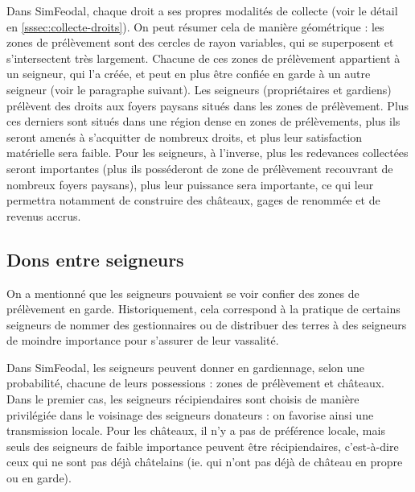 Dans SimFeodal, chaque droit a ses propres modalités de collecte (voir le détail en \cref{sssec:collecte-droits}).
On peut résumer cela de manière géométrique : les zones de prélèvement sont des cercles de rayon variables, qui se superposent et s'intersectent très largement.
Chacune de ces zones de prélèvement appartient à un seigneur, qui l'a créée, et peut en plus être confiée en garde à un autre seigneur (voir le paragraphe suivant).
Les seigneurs (propriétaires et gardiens) prélèvent des droits aux foyers paysans situés dans les zones de prélèvement.
Plus ces derniers sont situés dans une région dense en zones de prélèvements, plus ils seront amenés à s'acquitter de nombreux droits, et plus leur satisfaction matérielle sera faible.
Pour les seigneurs, à l'inverse, plus les redevances collectées seront importantes (plus ils posséderont de zone de prélèvement recouvrant de nombreux foyers paysans), plus leur puissance sera importante, ce qui leur permettra notamment de construire des châteaux, gages de renommée et de revenus accrus.

\subsection{Dons entre seigneurs \label{meca-dons}}

On a mentionné que les seigneurs pouvaient se voir confier des zones de prélèvement en garde.
Historiquement, cela correspond à la pratique de certains seigneurs de nommer des gestionnaires ou de distribuer des terres à des seigneurs de moindre importance pour s'assurer de leur vassalité.

Dans SimFeodal, les seigneurs peuvent donner en gardiennage, selon une probabilité, chacune de leurs possessions : zones de prélèvement et châteaux.
Dans le premier cas, les seigneurs récipiendaires sont choisis de manière privilégiée dans le voisinage des seigneurs donateurs : on favorise ainsi une transmission locale.
Pour les châteaux, il n'y a pas de préférence locale, mais seuls des seigneurs de faible importance peuvent être récipiendaires, c'est-à-dire ceux qui ne sont pas déjà châtelains (ie. qui n'ont pas déjà de château en propre ou en garde).

